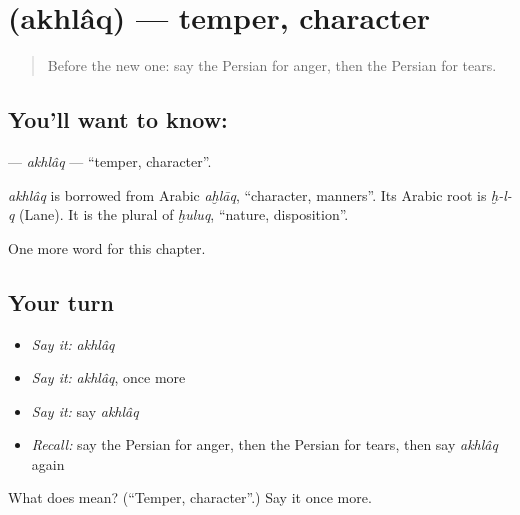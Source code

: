 \section[\texorpdfstring{\fa{اخلاق} (akhlâq)}{اخلاق (akhlâq)}]{ (akhlâq) — temper, character}

\label{lesson:FA-C170-akhlaq}



\begin{quote}
Before the new one: say the Persian for anger, then the Persian for tears.
\end{quote}

\subsection*{You'll want to know: }
\textbf{} — \emph{akhlâq} — \textquotedblleft{}temper, character\textquotedblright{}.

\begin{cousinweb}
\emph{akhlâq} is borrowed from Arabic \emph{aḫlāq}, \textquotedblleft{}character, manners\textquotedblright{}. Its Arabic root is \emph{ḫ-l-q} (Lane). It is the plural of \emph{ḫuluq}, \textquotedblleft{}nature, disposition\textquotedblright{}.
\end{cousinweb}

\begin{grammarlens}[title={What you've built}]
One more word for this chapter.
\end{grammarlens}

\subsection*{Your turn}
\begin{itemize}
\raggedright
  \item \emph{Say it:} \emph{akhlâq}
  \item \emph{Say it:} \emph{akhlâq}, once more
  \item \emph{Say it:} say \emph{akhlâq}
  \item \emph{Recall:} say the Persian for anger, then the Persian for tears, then say \emph{akhlâq} again
\end{itemize}

\begin{tcolorbox}[breakable,colback=teal!4,colframe=teal!35!black,title={Before you move on}]
What does  mean? (\textquotedblleft{}Temper, character\textquotedblright{}.) Say it once more.
\end{tcolorbox}
